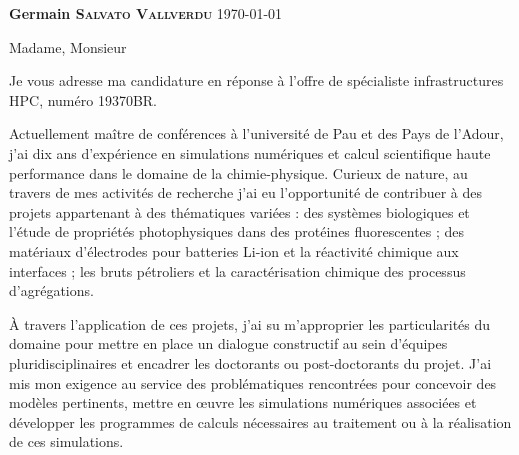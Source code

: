 \documentclass[11pt,a4paper,ragged2e]{../alta_letter}
\begin{document}
\name{}
\tagline{}


{\color{emphasis}\Large\bfseries Germain \textsc{Salvato Vallverdu}}
\hfill\today\par

\parbox{.5\textwidth}{\makecvheader}

\justify

\cvsection{~}

\setlength{\parindent}{0pt}
\setlength{\parskip}{1.5ex plus 0.5ex minus 0.5ex}

\bigskip

Madame, Monsieur

\medskip

Je vous adresse ma candidature en réponse à l'offre de spécialiste infrastructures HPC, numéro 19370BR.

Actuellement maître de conférences à l'université de Pau et des Pays de l'Adour, j'ai dix ans d'expérience en simulations numériques et calcul scientifique haute performance dans le domaine de la chimie-physique. Curieux de nature, au travers de mes activités de recherche j'ai eu l'opportunité de contribuer à des projets appartenant à des thématiques variées : des systèmes biologiques et l'étude de propriétés photophysiques dans des protéines fluorescentes ; des matériaux d'électrodes pour batteries Li-ion et la réactivité chimique aux interfaces ; les bruts pétroliers et la caractérisation chimique des processus d'agrégations.

À travers l'application de ces projets, j'ai su m'approprier les particularités du domaine pour mettre en place un dialogue constructif au sein d'équipes pluridisciplinaires et encadrer les doctorants ou post-doctorants du projet. J'ai mis mon exigence au service des problématiques rencontrées pour concevoir des modèles pertinents, mettre en œuvre les simulations numériques associées et développer les programmes de calculs nécessaires au traitement ou à la réalisation de ces simulations.
\end{document}
